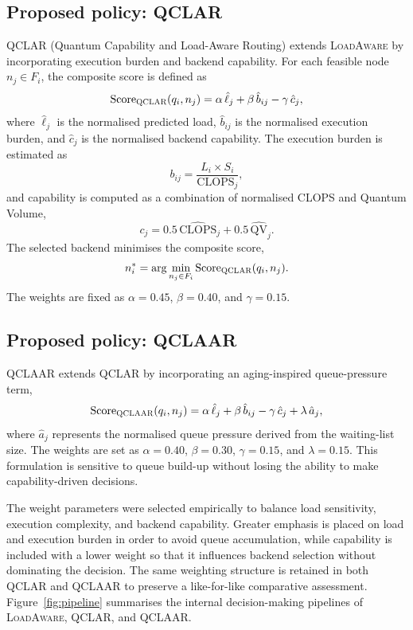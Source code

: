 \documentclass[preprint,12pt]{elsarticle}
\newcommand{\QCLAR}{\textsc{QCLAR}}
\newcommand{\QCLAAR}{\textsc{QCLAAR}}
\newcommand{\LoadAware}{\textsc{LoadAware}}
\newcommand{\CLOPS}{\mathrm{CLOPS}}
\newcommand{\QV}{\mathrm{QV}}
\begin{document}
\subsection{Proposed policy: QCLAR}
\QCLAR{} (Quantum Capability and Load-Aware Routing) extends \LoadAware{} by
incorporating execution burden and backend capability. For each feasible node
$n_j \in F_i$, the composite score is defined as
\begin{equation}
\mathrm{Score}_{\QCLAR{}}(q_i, n_j)
  = \alpha\,\hat{\ell}_j + \beta\,\hat{b}_{ij} - \gamma\,\hat{c}_j ,
\label{eq:qclar}
\end{equation}
where $\hat{\ell}_j$ is the normalised predicted load, $\hat{b}_{ij}$ is the
normalised execution burden, and $\hat{c}_j$ is the normalised backend
capability. The execution burden is estimated as
\begin{equation}
b_{ij} = \frac{L_i \times S_i}{\CLOPS_j} ,
\label{eq:burden}
\end{equation}
and capability is computed as a combination of normalised CLOPS and Quantum
Volume,
\begin{equation}
c_j = 0.5\,\widehat{\CLOPS}_j + 0.5\,\widehat{\QV}_j .
\label{eq:capability}
\end{equation}
The selected backend minimises the composite score,
\begin{equation}
n_i^{*} = \arg\min_{n_j \in F_i} \mathrm{Score}_{\QCLAR{}}(q_i, n_j).
\label{eq:qclar-select}
\end{equation}
The weights are fixed as $\alpha = 0.45$, $\beta = 0.40$, and $\gamma = 0.15$.

\subsection{Proposed policy: QCLAAR}
\QCLAAR{} extends \QCLAR{} by incorporating an aging-inspired queue-pressure
term,
\begin{equation}
\mathrm{Score}_{\QCLAAR{}}(q_i, n_j)
  = \alpha\,\hat{\ell}_j + \beta\,\hat{b}_{ij} - \gamma\,\hat{c}_j
  + \lambda\,\hat{a}_j ,
\label{eq:qclaar}
\end{equation}
where $\hat{a}_j$ represents the normalised queue pressure derived from the
waiting-list size. The weights are set as $\alpha = 0.40$, $\beta = 0.30$,
$\gamma = 0.15$, and $\lambda = 0.15$. This formulation is sensitive to queue
build-up without losing the ability to make capability-driven decisions.

The weight parameters were selected empirically to balance load sensitivity,
execution complexity, and backend capability. Greater emphasis is placed on load
and execution burden in order to avoid queue accumulation, while capability is
included with a lower weight so that it influences backend selection without
dominating the decision. The same weighting structure is retained in both
\QCLAR{} and \QCLAAR{} to preserve a like-for-like comparative assessment.
Figure~\ref{fig:pipeline} summarises the internal decision-making pipelines of
\LoadAware{}, \QCLAR{}, and \QCLAAR{}.
\end{document}
